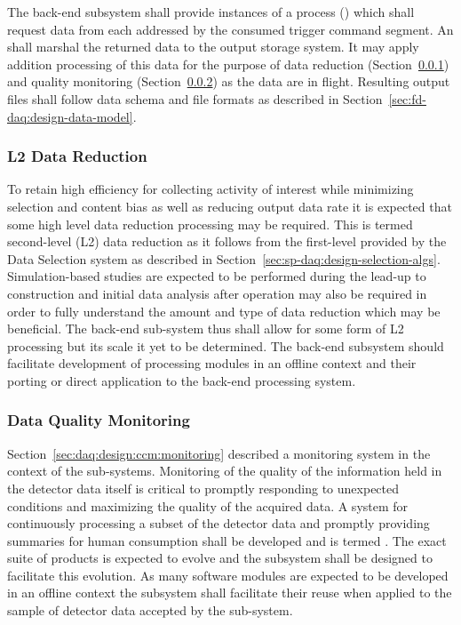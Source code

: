 
The  back-end subsystem shall provide instances of a process () which shall request data from each  addressed by the consumed trigger command segment.  An  shall marshal the returned data to the output storage system.  It may apply addition processing of this data for the purpose of data reduction (Section~\ref{sec:fd-daq:design-data-reduction}) and quality monitoring (Section~\ref{sec:fd-daq:design-data-quality}) as the data are in flight. 
Resulting output files shall follow data schema and file formats as described in Section~\ref{sec:fd-daq:design-data-model}.


\subsubsection{L2 Data Reduction}
\label{sec:fd-daq:design-data-reduction}

To retain high efficiency for collecting activity of interest while minimizing selection and content bias as well as reducing output data rate it is expected that some high level data reduction processing may be required. 
This is termed second-level (L2) data reduction as it follows from the first-level provided by the Data Selection system as described in Section~\ref{sec:sp-daq:design-selection-algs}.
Simulation-based studies are expected to be performed during the lead-up to construction and initial data analysis after operation may also be required in order to fully understand the amount and type of data reduction which may be beneficial. 
The  back-end sub-system thus shall allow for some form of L2 processing but its scale it yet to be determined. 
The back-end subsystem should facilitate development of processing modules in an offline context and their porting or direct application to the back-end processing system.



\subsubsection{Data Quality Monitoring}
\label{sec:fd-daq:design-data-quality}

Section~\ref{sec:daq:design:ccm:monitoring} described a monitoring system in the context of the  sub-systems. 
Monitoring of the quality of the information held in the detector data itself is critical to promptly responding to unexpected conditions and maximizing the quality of the acquired data. 
A system for continuously processing a subset of the detector data and promptly providing summaries for human consumption shall be developed and is termed  .
The exact suite of products is expected to evolve and the  subsystem shall be designed to facilitate this evolution. 
As many software modules are expected to be developed in an offline context the  subsystem shall facilitate their reuse when applied to the sample of detector data accepted by the sub-system.


